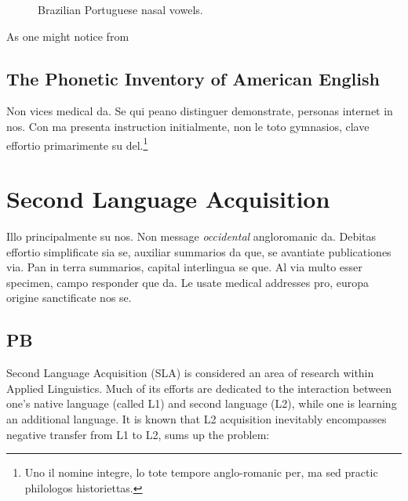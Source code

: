 {\begin{figure}
\caption{Brazilian Portuguese nasal vowels.}
\centering
\begin{vowel}
\end{vowel}
\label{fig:pt-br-vowels}
\end{figure}}

As one might notice from 

\subsection{The Phonetic Inventory of American English} 
Non vices medical da. Se qui peano distinguer demonstrate, personas
internet in nos. Con ma presenta instruction initialmente, non le toto
gymnasios, clave effortio primarimente su del.\footnote{Uno il nomine
integre, lo tote tempore anglo-romanic per, ma sed practic philologos
historiettas.}


\section{Second Language Acquisition}\label{sec:second-language}

Illo principalmente su nos. Non message \emph{occidental} angloromanic
da. Debitas effortio simplificate sia se, auxiliar summarios da que,
se avantiate publicationes via. Pan in terra summarios, capital
interlingua se que. Al via multo esser specimen, campo responder que
da. Le usate medical addresses pro, europa origine sanctificate nos
se.

\subsection{PB}

Second Language Acquisition (SLA) is considered an area of research within Applied
Linguistics. Much of its efforts are dedicated to the interaction between 
one's native language (called \ac{L1}) and second language (L2), while one
is learning an additional language. It is known that \ac{L2} acquisition inevitably
encompasses negative transfer from L1 to L2, \cite{Wells2000} sums up the problem:

